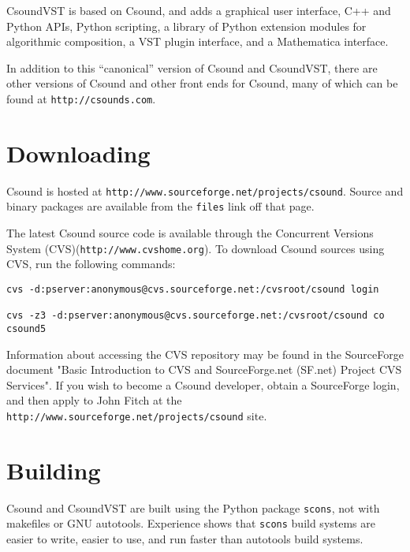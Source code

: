 \documentclass[10pt,letterpaper,onecolumn]{article}
\begin{document}
CsoundVST is based on Csound, and adds a graphical user interface, C++ and Python APIs, Python scripting, a library of Python extension modules for algorithmic composition, a VST plugin interface, and a Mathematica interface.

In addition to this ``canonical'' version of Csound and CsoundVST, there are other versions of Csound and other front ends for Csound, many of which can be found at \texttt{http://csounds.com}.
\section{Downloading}
Csound is hosted at \texttt{http:\-//www.sourceforge.net/projects/\-csound}. Source and binary packages are available from the \texttt{files} link off that page.

The latest Csound source code is available through the Concurrent Versions System (CVS)(\texttt{http:\-//www.cvshome.org}). To download Csound sources using CVS, run the following commands:

\begin{verbatim}
cvs -d:pserver:anonymous@cvs.sourceforge.net:/cvsroot/csound login 
 
cvs -z3 -d:pserver:anonymous@cvs.sourceforge.net:/cvsroot/csound co csound5 
\end{verbatim}

Information about accessing the CVS repository may be found in the SourceForge document "Basic Introduction to CVS and SourceForge.net (SF.net) Project CVS Services". If you wish to become a Csound developer, obtain a SourceForge login, and then apply to John Fitch at the \texttt{http:\-//www.sourceforge.net/projects/\-csound} site.

\section{Building}
Csound and CsoundVST are built using the Python package \texttt{scons}, not with makefiles or GNU autotools. Experience shows that \texttt{scons} build systems are easier to write, easier to use, and run faster than autotools build systems.
\end{document}
